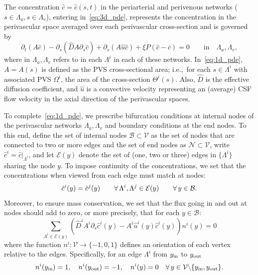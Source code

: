 The concentration $\hat{c} = \hat{c}(s, t)$ in the periarterial and
perivenous networks ($s \in \Lambda_a, s \in \Lambda_v$), entering
in~\eqref{eq:3d_pde}, represents the concentration in the perivascular
space averaged over each perivascular cross-section and is governed by 
\begin{equation}
  \partial_t (A  \hat c) - \partial_s( \hat D A \partial_s \hat c  ) + \partial_s(A \hat u \hat c )  +  \xi P (\hat c - \overline{c}) = 0
  \qquad \text{in} \quad \Lambda_a, \Lambda_v ,
\label{eq:1d_pde}
\end{equation}
where in $\Lambda_a, \Lambda_v$ refers to in each $\Lambda^i$ in each
of these networks. In~\eqref{eq:1d_pde}, $A = A(s)$ is defined as the
PVS cross-sectional area; i.e.,~for each $s \in \Lambda^i$ with
associated PVS $\Omega^i$, the area of the cross-section
$\Theta^i(s)$. Also, $\hat{D}$ is the effective diffusion coefficient,
and $\hat{u}$ is a convective velocity representing an (average) CSF
flow velocity in the axial direction of the perivascular spaces.

To complete~\eqref{eq:1d_pde}, we prescribe bifurcation conditions at
internal nodes of the perivascular networks $\Lambda_a, \Lambda_v$ and
boundary conditions at the end nodes. To this end, define the set of
internal nodes $\mathcal{B} \subset \mathcal{V}$ as the set of nodes
that are connected to two or more edges and the set of end nodes as
$\mathcal{N} \subset \mathcal{V}$, write $\hat{c}^i =
\hat{c}|_{\Lambda^i}$, and let $\mathcal{E}(y)$ denote the set of
(one, two or three) edges in $\{\Lambda^i\}$ sharing the node $y$. To
impose continuity of the concentrations, we set that the
concentrations when viewed from each edge must match at nodes:
\begin{equation}
  \hat{c}^i (y) = \hat{c}^j(y)
  \qquad \forall \, \Lambda^i, \Lambda^j \in \mathcal{E}(y)
  \qquad \forall \, y \in \mathcal{B} .
  \label{eq:conc_continuity}
\end{equation}
Moreover, to ensure mass conservation, we set that the flux
going in and out at nodes should add to zero, or more precisely, that
for each $y \in \mathcal{B}$:
\begin{equation}
  \sum_{\Lambda^i \in \mathcal{E}(y)}
  \left (\hat{D}^i A^i \partial_s \hat{c}^i (y) - A^i \hat u^i(y) \hat{c}^i(y) \right ) n^i(y)
  = 0
  \label{eq:flux_conservation}
\end{equation}
where the function $n^i : \mathcal{V} \rightarrow \{-1, 0, 1\}$
defines an orientation of each vertex relative to the
edges. Specifically, for an edge $\Lambda^i$ from $y_{\rm in}$ to $y_{\rm out}$
\begin{equation}
  n^i(y_{\rm in}) = 1, \quad
  n^i(y_{\rm{out}}) = -1, \quad
  n^i(y) = 0 \quad \forall \, y \in 
  \mathcal{V} \backslash \{ y_{\rm in}, y_{\rm out} \} .  
  \label{eq:def:sign}
\end{equation}

